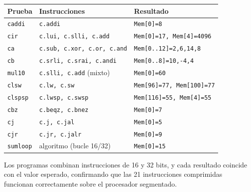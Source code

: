 \documentclass[11pt,a4paper]{article}
\begin{document}
\begin{center}
\small
\begin{tabular}{@{}lll@{}}
\toprule
\textbf{Prueba} & \textbf{Instrucciones} & \textbf{Resultado} \\
\midrule
\texttt{caddi}   & \texttt{c.addi} & \texttt{Mem[0]=8} \\
\texttt{cir}     & \texttt{c.lui, c.slli, c.add} & \texttt{Mem[0]=17, Mem[4]=4096} \\
\texttt{ca}      & \texttt{c.sub, c.xor, c.or, c.and} & \texttt{Mem[0..12]=2,6,14,8} \\
\texttt{cb}      & \texttt{c.srli, c.srai, c.andi} & \texttt{Mem[0..8]=10,-4,4} \\
\texttt{mul10}   & \texttt{c.slli, c.add} (mixto) & \texttt{Mem[0]=60} \\
\texttt{clsw}    & \texttt{c.lw, c.sw} & \texttt{Mem[96]=77, Mem[100]=77} \\
\texttt{clspsp}  & \texttt{c.lwsp, c.swsp} & \texttt{Mem[116]=55, Mem[4]=55} \\
\texttt{cbz}     & \texttt{c.beqz, c.bnez} & \texttt{Mem[0]=7} \\
\texttt{cj}      & \texttt{c.j, c.jal} & \texttt{Mem[0]=5} \\
\texttt{cjr}     & \texttt{c.jr, c.jalr} & \texttt{Mem[0]=9} \\
\texttt{sumloop} & algoritmo (bucle 16/32) & \texttt{Mem[0]=15} \\
\bottomrule
\end{tabular}
\end{center}

Los programas combinan instrucciones de 16 y 32 bits, y cada resultado coincide
con el valor esperado, confirmando que las 21 instrucciones comprimidas funcionan
correctamente sobre el procesador segmentado.
\end{document}
